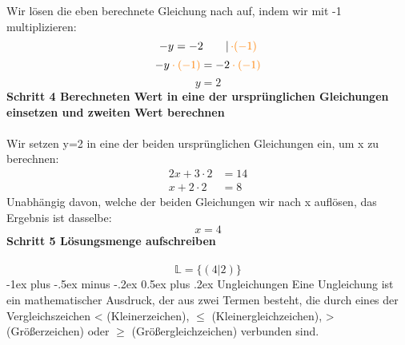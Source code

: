 \documentclass[10pt,landscape]{article}
\makeatletter
\renewcommand{\section}{\@startsection{section}{1}{0mm}%
                                {-1ex plus -.5ex minus -.2ex}%
                                {0.5ex plus .2ex}%
                                {\normalfont\large\bfseries}}
\makeatother
\begin{document}
\begin{multicols}{3}
    Wir lösen die eben berechnete Gleichung nach auf, indem wir mit -1 multiplizieren:
    \[-y = -2 \qquad |\, {\color{orange}\cdot (-1)}\]
    \[-y {\color{orange} \: \cdot \: (-1)} = -2 {\color{orange} \: \cdot \: (-1)}\]
    \[y = 2\]
    \textbf{Schritt 4 Berechneten Wert in eine der ursprünglichen Gleichungen einsetzen und zweiten Wert berechnen}\\~\\
    Wir setzen y=2 in eine der beiden ursprünglichen Gleichungen ein, um x zu berechnen:
    \begin{align*} 2x + 3 \cdot 2 &= 14 \\ x + 2 \cdot 2 &= 8 \end{align*}
    Unabhängig davon, welche der beiden Gleichungen wir nach x auflösen, das Ergebnis ist dasselbe:
    \[x = 4\]
    \textbf{Schritt 5 Lösungsmenge aufschreiben}\\~\\
    \[\mathbb{L} = \{(4|2)\}\]
    \section{Ungleichungen}
    Eine Ungleichung ist ein mathematischer Ausdruck, der aus zwei Termen besteht, die durch eines der Vergleichszeichen < (Kleinerzeichen), $\leq$ (Kleinergleichzeichen),
    > (Größerzeichen) oder $\geq$ (Größergleichzeichen) verbunden sind.

\end{multicols}
\end{document}
